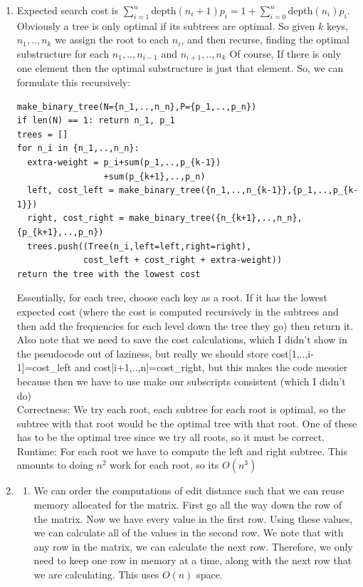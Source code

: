 \documentclass[11pt]{article}
\begin{document}
\begin{enumerate}
\newpage
\item
Expected search cost is $\sum_{i=1}^{n}\text{depth}(n_i+1)p_i=1+\sum_{i=0}^n\text{depth}(n_i)p_i$.\\
Obviously a tree is only optimal if its subtrees are optimal. So given $k$ keys, $n_1,..,n_k$ we assign the root to each $n_i$, and then recurse, finding the optimal substructure for each $n_1,..,n_{i-1}$ and $n_{i+1},..,n_k$ Of course, If there is only one element then the optimal substructure is just that element. So, we can formulate this recursively:
\begin{verbatim}
make_binary_tree(N={n_1,..,n_n},P={p_1,..,p_n})
if len(N) == 1: return n_1, p_1
trees = []
for n_i in {n_1,..,n_n}:
  extra-weight = p_i+sum(p_1,..,p_{k-1})
                 +sum(p_{k+1},..,p_n)
  left, cost_left = make_binary_tree({n_1,..,n_{k-1}},{p_1,..,p_{k-1}})
  right, cost_right = make_binary_tree({n_{k+1},..,n_n},{p_{k+1},..,p_n})
  trees.push((Tree(n_i,left=left,right=right), 
             cost_left + cost_right + extra-weight))
return the tree with the lowest cost
\end{verbatim}
Essentially, for each tree, choose each key as a root. If it has the lowest expected cost (where the cost is computed recursively in the subtrees and then add the frequencies for each level down the tree they go) then return it. Also note that we need to save the cost calculations, which I didn't show in the pseudocode out of laziness, but really we should store cost[1,..,i-1]=cost\_left and cost[i+1,..,n]=cost\_right, but this makes the code messier because then we have to use make our subscripts consistent (which I didn't do)\\
Correctness: We try each root, each subtree for each root is optimal, so the subtree with that root would be the optimal tree with that root. One of these has to be the optimal tree since we try all roots, so it must be correct.\\
Runtime: For each root we have to compute the left and right subtree. This amounts to doing $n^2$ work for each root, so its $O(n^3)$
\newpage
\item 
\begin{enumerate}
\item We can order the computations of edit distance such that we can reuse memory allocated for the matrix. First go all the way down the row of the matrix. Now we have every value in the first row. Using these values, we can calculate all of the values in the second row. We note that with any row in the matrix, we can calculate the next row. Therefore, we only need to keep one row in memory at a time, along with the next row that we are calculating. This uses $O(n)$ space.

\end{enumerate}
\end{enumerate}
\end{document}
